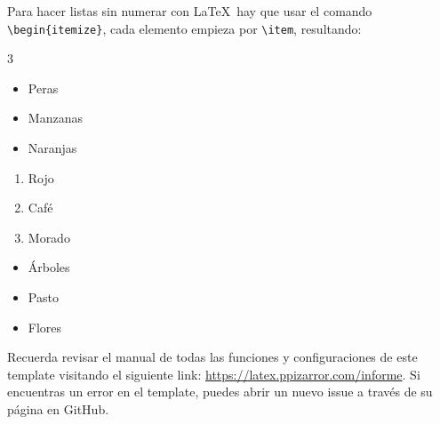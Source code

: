 	Para hacer listas sin numerar con \LaTeX\ hay que usar el comando \texttt{\textbackslash begin\{itemize\}}, cada elemento empieza por \texttt{\textbackslash item}, resultando:

	\begin{multicols}{3}
		\begin{itemize}[label={--}]
			\item Peras
			\item Manzanas
			\item Naranjas
		\end{itemize}

		\begin{enumerate}[label={*}]
			\item Rojo
			\item Café
			\item Morado
		\end{enumerate}

		\begin{itemize}
			\item Árboles
			\item Pasto
			\item Flores
		\end{itemize}
	\end{multicols}


	Recuerda revisar el manual de todas las funciones y configuraciones de este template visitando el siguiente link: \url{https://latex.ppizarror.com/informe}. Si encuentras un error en el template, puedes abrir un nuevo issue a través de su página en GitHub.

